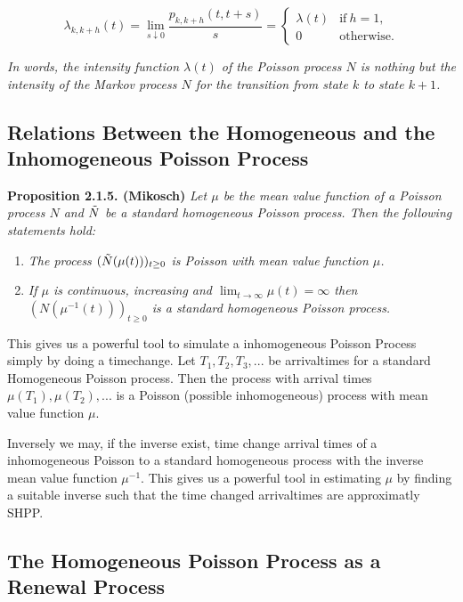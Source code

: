 \documentclass[a4paper,12pt,openany]{book}
\providecommand{\tightlist}{%
 \setlength{\itemsep}{0pt}\setlength{\parskip}{0pt}}
\begin{document}
\[
\lambda_{k,k+h}(t)=\lim_{s\downarrow 0}\frac{p_{k,k+h}(t,t+s)}{s}=
\left\{\begin{array}{cc}
\lambda(t) & \text{if}\ h=1 ,\\
0 & \text{otherwise}.
\end{array}\right.
\]

\emph{In words, the intensity function \(\lambda(t)\) of the Poisson process \(N\) is nothing but the intensity of the Markov process \(N\) for the transition from state \(k\) to state \(k + 1\).}

\hypertarget{relations-between-the-homogeneous-and-the-inhomogeneous-poisson-process}{%
\subsection{Relations Between the Homogeneous and the Inhomogeneous Poisson Process}\label{relations-between-the-homogeneous-and-the-inhomogeneous-poisson-process}}

\textbf{Proposition 2.1.5. (Mikosch)} \emph{Let \(\mu\) be the mean value function of a Poisson process \(N\) and \(\Tilde{N}\) be a standard homogeneous Poisson process. Then the following statements hold:}

\begin{enumerate}
\def\labelenumi{(\arabic{enumi})}
\tightlist
\item
  \emph{The process \((\Tilde{N}(\mu(t)))_{t\ge 0}\) is Poisson with mean value function \(\mu\).}
\item
  \emph{If \(\mu\) is continuous, increasing and \(\lim_{t\to\infty}\mu(t)=\infty\) then \((N(\mu^{-1}(t)))_{t\ge 0}\) is a standard homogeneous Poisson process.}
\end{enumerate}

This gives us a powerful tool to simulate a inhomogeneous Poisson Process simply by doing a timechange. Let \(T_1,T_2,T_3,...\) be arrivaltimes for a standard Homogeneous Poisson process. Then the process with arrival times \(\mu(T_1),\mu(T_2),...\) is a Poisson (possible inhomogeneous) process with mean value function \(\mu\).

Inversely we may, if the inverse exist, time change arrival times of a inhomogeneous Poisson to a standard homogeneous process with the inverse mean value function \(\mu^{-1}\). This gives us a powerful tool in estimating \(\mu\) by finding a suitable inverse such that the time changed arrivaltimes are approximatly SHPP.

\hypertarget{the-homogeneous-poisson-process-as-a-renewal-process}{%
\subsection{The Homogeneous Poisson Process as a Renewal Process}\label{the-homogeneous-poisson-process-as-a-renewal-process}}
\end{document}
